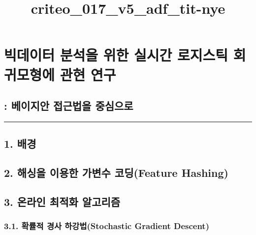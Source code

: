 \documentclass[11pt]{article}
\title{criteo\_017\_v5\_adf\_tit-nye}
\begin{document}
    \maketitle




    \section{빅데이터 분석을 위한 실시간 로지스틱 회귀모형에 관현
연구}\label{uxbe45uxb370uxc774uxd130-uxbd84uxc11duxc744-uxc704uxd55c-uxc2e4uxc2dcuxac04-uxb85cuxc9c0uxc2a4uxd2f1-uxd68cuxadc0uxbaa8uxd615uxc5d0-uxad00uxd604-uxc5f0uxad6c}

\subsection{: 베이지안 접근법을
중심으로}\label{uxbca0uxc774uxc9c0uxc548-uxc811uxadfcuxbc95uxc744-uxc911uxc2ecuxc73cuxb85c}

    \begin{center}\rule{0.5\linewidth}{\linethickness}\end{center}

    \subsection{1. 배경}\label{uxbc30uxacbd}



    \subsection{2. 해싱을 이용한 가변수 코딩(Feature
Hashing)}\label{uxd574uxc2f1uxc744-uxc774uxc6a9uxd55c-uxac00uxbcc0uxc218-uxcf54uxb529feature-hashing}



    \subsection{3. 온라인 최적화
알고리즘}\label{uxc628uxb77cuxc778-uxcd5cuxc801uxd654-uxc54cuxace0uxb9acuxc998}



    \subsubsection{3.1. 확률적 경사 하강법(Stochastic Gradient
Descent)}\label{uxd655uxb960uxc801-uxacbduxc0ac-uxd558uxac15uxbc95stochastic-gradient-descent}
\end{document}
